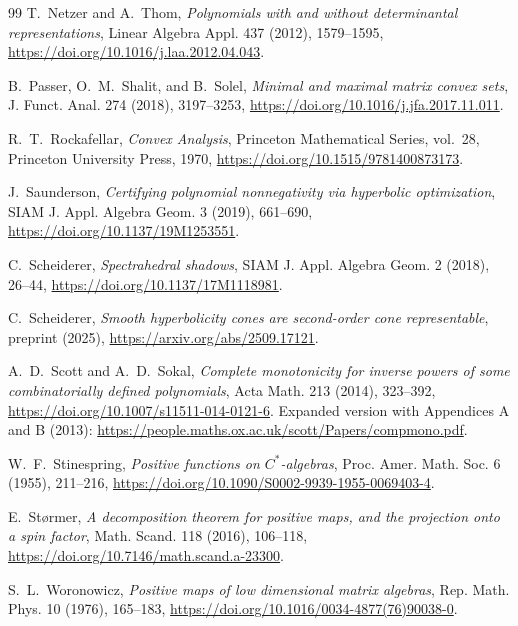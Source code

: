 \documentclass[11pt,onecolumn]{article}
\theoremstyle{blueplain}
\theoremstyle{bluedefinition}
\theoremstyle{bluedefinition}
\begin{document}
\begin{thebibliography}{99}
T.~Netzer and A.~Thom,
\emph{Polynomials with and without determinantal representations},
Linear Algebra Appl. 437 (2012), 1579--1595,
\url{https://doi.org/10.1016/j.laa.2012.04.043}.

B.~Passer, O.~M.~Shalit, and B.~Solel,
\emph{Minimal and maximal matrix convex sets},
J. Funct. Anal. 274 (2018), 3197--3253,
\url{https://doi.org/10.1016/j.jfa.2017.11.011}.

R.~T.~Rockafellar,
\emph{Convex Analysis},
Princeton Mathematical Series, vol.~28,
Princeton University Press, 1970,
\url{https://doi.org/10.1515/9781400873173}.

J.~Saunderson,
\emph{Certifying polynomial nonnegativity via hyperbolic optimization},
SIAM J. Appl. Algebra Geom. 3 (2019), 661--690,
\url{https://doi.org/10.1137/19M1253551}.

C.~Scheiderer,
\emph{Spectrahedral shadows},
SIAM J. Appl. Algebra Geom. 2 (2018), 26--44,
\url{https://doi.org/10.1137/17M1118981}.

C.~Scheiderer,
\emph{Smooth hyperbolicity cones are second-order cone representable},
preprint (2025),
\url{https://arxiv.org/abs/2509.17121}.

A.~D.~Scott and A.~D.~Sokal,
\emph{Complete monotonicity for inverse powers of some combinatorially defined polynomials},
Acta Math. 213 (2014), 323--392,
\url{https://doi.org/10.1007/s11511-014-0121-6}.
Expanded version with Appendices A and B (2013):
\url{https://people.maths.ox.ac.uk/scott/Papers/compmono.pdf}.

W.~F.~Stinespring,
\emph{Positive functions on $C^*$-algebras},
Proc. Amer. Math. Soc. 6 (1955), 211--216,
\url{https://doi.org/10.1090/S0002-9939-1955-0069403-4}.

E.~St\o rmer,
\emph{A decomposition theorem for positive maps, and the projection onto a spin factor},
Math. Scand. 118 (2016), 106--118,
\url{https://doi.org/10.7146/math.scand.a-23300}.

S.~L.~Woronowicz,
\emph{Positive maps of low dimensional matrix algebras},
Rep. Math. Phys. 10 (1976), 165--183,
\url{https://doi.org/10.1016/0034-4877(76)90038-0}.

\end{thebibliography}
\end{document}
